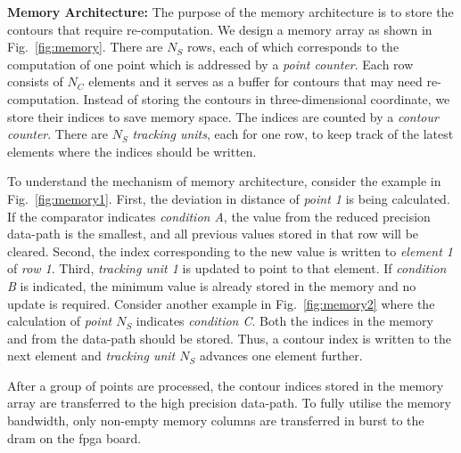 \noindent \textbf{Memory Architecture:}
The purpose of the memory architecture is to store the contours that require re-computation.
We design a memory array as shown in Fig.~\ref{fig:memory}.
There are $N_S$ rows, each of which corresponds to the computation of one point which is addressed by a \textit{point counter}.
Each row consists of $N_C$ elements and it serves as a buffer for contours that may need re-computation.
Instead of storing the contours in three-dimensional coordinate, we store their indices to save memory space.
The indices are counted by a \textit{contour counter}.
There are $N_S$ \textit{tracking units}, each for one row, to keep track of the latest elements where the indices should be written.

To understand the mechanism of memory architecture, consider the example in Fig.~\ref{fig:memory1}.
First, the deviation in distance of \textit{point 1} is being calculated.
If the comparator indicates \emph{condition A}, the value from the reduced precision data-path is the smallest, and all previous values stored in that row will be cleared.
Second, the index corresponding to the new value is written to \textit{element 1} of \textit{row 1}.
Third, \textit{tracking unit 1} is updated to point to that element.
If \emph{condition B} is indicated, the minimum value is already stored in the memory and no update is required.
Consider another example in Fig.~\ref{fig:memory2} where the calculation of \textit{point $N_S$} indicates \emph{condition C}. 
Both the indices in the memory and from the data-path should be stored.
Thus, a contour index is written to the next element and \textit{tracking unit $N_S$} advances one element further.

After a group of points are processed, the contour indices stored in the memory array are transferred to the high precision data-path.
To fully utilise the memory bandwidth, only non-empty memory columns are transferred in burst to the \gls{dram} on the \gls{fpga} board.

